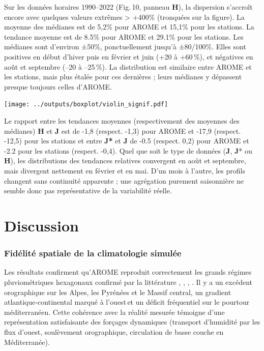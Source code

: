 \documentclass[
  article,
  nofooter,
  noheadings]{jss}
\begin{document}
Sur les données horaires 1990--2022 (Fig.\,10, panneau \textbf{H}), la
dispersion s'accroît encore avec quelques valeurs extrêmes
\textgreater{} +400\% (tronquées sur la figure). La moyenne des médianes
est de 5,2\% pour AROME et 15,1\% pour les stations. La tendance moyenne
est de 8.5\% pour AROME et 29.1\% pour les stations. Les médianes sont
d'environ ±50\%, ponctuellement jusqu'à ±80/100\%. Elles sont positives
en début d'hiver puis en février et juin (+20 à +60\,\%), et négatives
en août et septembre (--20 à --25\,\%). La distribution est similaire
entre AROME et les stations, mais plus étalée pour ces dernières ; leurs
médianes y dépassent presque toujours celles d'AROME.

\texttt{[image: ../outputs/boxplot/violin\_signif.pdf]}


\hfill\break

Le rapport entre les tendances moyennes (respectivement des moyennes des
médianes) \textbf{H} et \textbf{J} est de -1,8 (respect. -1,3) pour
AROME et -17,9 (respect. -12,5) pour les stations et entre \textbf{J*}
et \textbf{J} de -0.5 (respect. 0,2) pour AROME et -2.2 pour les
stations (respect. -0,4). Quel que soit le type de données (\textbf{J},
\textbf{J}* ou \textbf{H}), les distributions des tendances relatives
convergent en août et septembre, mais divergent nettement en février et
en mai. D'un mois à l'autre, les profils changent sans continuité
apparente ; une agrégation purement saisonnière ne semble donc pas
représentative de la variabilité réelle.

\section{Discussion}\label{discussion}

\subsubsection{Fidélité spatiale de la climatologie
simulée}\label{fiduxe9lituxe9-spatiale-de-la-climatologie-simuluxe9e}

Les résultats confirment qu'AROME reproduit correctement les grands
régimes pluviométriques hexagonaux confirmé par la littérature
\citep{Fumiere2020}, \citep{caillaud2021simulation},
\citep{hess-28-2579-2024}, \citep{LucasPicher2024}. Il y a un excédent
orographique sur les Alpes, les Pyrénées et le Massif central, un
gradient atlantique‑continental marqué à l'ouest\,et un déficit
fréquentiel sur le pourtour méditerranéen. Cette cohérence avec la
réalité mesurée témoigne d'une représentation satisfaisante des forçages
dynamiques (transport d'humidité par les flux d'ouest, soulèvement
orographique, circulation de basse couche en Méditerranée).
\end{document}
